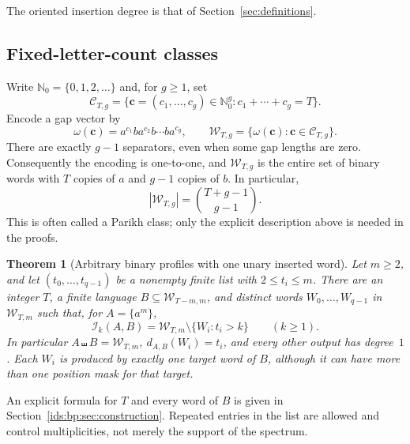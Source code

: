 \documentclass[11pt,letterpaper]{article}
\newtheorem{theorem}{Theorem}[section]
\theoremstyle{definition}\newtheorem{definition}[theorem]{Definition}
\theoremstyle{remark}\newtheorem{remark}[theorem]{Remark}
\theoremstyle{definition}\newtheorem{question}[theorem]{Question}
\newcommand{\Nzero}{\mathbb N_0}
\newcommand{\sh}{\mathbin{\shuffle}}
\newcommand{\ins}[3]{\mathcal I_{#1}(#2,#3)}
\newcommand{\bpgap}[1]{\omega(#1)}
\newcommand{\bpC}[2]{\mathcal C_{#1,#2}}
\newcommand{\bpW}[2]{\mathcal W_{#1,#2}}
\begin{document}
The oriented insertion degree is that of Section~\ref{sec:definitions}.

\subsection{Fixed-letter-count classes}
Write $\Nzero=\{0,1,2,\ldots\}$ and, for $g\geq1$, set
\[
 \bpC{T}{g}=\{\mathbf c=(c_1,\ldots,c_g)\in\Nzero^g:
                   c_1+\cdots+c_g=T\}.
\]
Encode a gap vector by
\begin{equation}
 \bpgap{\mathbf c}=a^{c_1}b a^{c_2}b\cdots b a^{c_g},\qquad
 \bpW{T}{g}=\{\bpgap{\mathbf c}:\mathbf c\in\bpC{T}{g}\}.
 \label{ids:bp:eq:gap-word}
\end{equation}
There are exactly $g-1$ separators, even when some gap lengths are zero.
Consequently the encoding is one-to-one, and $\bpW{T}{g}$ is the entire set of
binary words with $T$ copies of $a$ and $g-1$ copies of $b$. In particular,
\begin{equation}
 |\bpW{T}{g}|=\binom{T+g-1}{g-1}.
 \label{ids:bp:eq:class-size}
\end{equation}
This is often called a Parikh class; only the explicit description above is
needed in the proofs.

\begin{theorem}[Arbitrary binary profiles with one unary inserted word]
\label{ids:bp:thm:profile-main}
Let $m\geq2$, and let $(t_0,\ldots,t_{q-1})$ be a nonempty finite list with
$2\leq t_i\leq m$. There are an integer $T$, a finite language
$B\subseteq\bpW{T-m}{m}$, and distinct words $W_0,\ldots,W_{q-1}$ in
$\bpW{T}{m}$ such that, for $A=\{a^m\}$,
\begin{equation}
 \ins{k}{A}{B}=\bpW{T}{m}\setminus\{W_i:t_i>k\}
 \qquad(k\geq1).
 \label{ids:bp:eq:profile-main}
\end{equation}
In particular $A\sh B=\bpW{T}{m}$, $d_{A,B}(W_i)=t_i$, and every other
output has degree~$1$. Each $W_i$ is produced by exactly one target word of
$B$, although it can have more than one position mask for that target.
\end{theorem}

An explicit formula for $T$ and every word of $B$ is given in
Section~\ref{ids:bp:sec:construction}. Repeated entries in the list are
allowed and control multiplicities, not merely the support of the spectrum.
\end{document}
